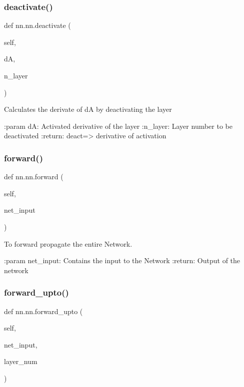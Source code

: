 \subsubsection{\texorpdfstring{deactivate()}{deactivate()}}
{\footnotesize\ttfamily def nn.\+nn.\+deactivate (\begin{DoxyParamCaption}\item[{}]{self,  }\item[{}]{dA,  }\item[{}]{n\+\_\+layer }\end{DoxyParamCaption})}

\begin{DoxyVerb}Calculates the derivate of dA by deactivating the layer

:param dA: Activated derivative of the layer
:n_layer: Layer number to be deactivated
:return: deact=> derivative of activation 
\end{DoxyVerb}
 \mbox{\label{classnn_1_1nn_ae07002745b03901814d92ac66fe87781}} 
\subsubsection{\texorpdfstring{forward()}{forward()}}
{\footnotesize\ttfamily def nn.\+nn.\+forward (\begin{DoxyParamCaption}\item[{}]{self,  }\item[{}]{net\+\_\+input }\end{DoxyParamCaption})}

\begin{DoxyVerb}To forward propagate the entire Network.

:param net_input: Contains the input to the Network
:return: Output of the network
\end{DoxyVerb}
 \mbox{\label{classnn_1_1nn_ac3d2b61ed992dc615eacda8e75a61a2b}} 
\subsubsection{\texorpdfstring{forward\+\_\+upto()}{forward\_upto()}}
{\footnotesize\ttfamily def nn.\+nn.\+forward\+\_\+upto (\begin{DoxyParamCaption}\item[{}]{self,  }\item[{}]{net\+\_\+input,  }\item[{}]{layer\+\_\+num }\end{DoxyParamCaption})}

